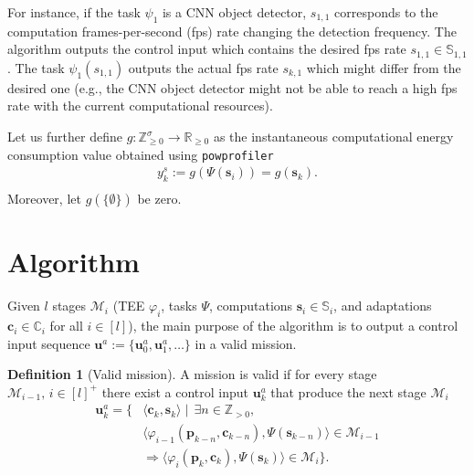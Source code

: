 \documentclass[letterpaper,10pt,conference]{ieeeconf}
\newcommand{\stt}[1]{{\small\tt #1}} %
\newcommand{\powprof}{\stt{powprofiler}}
\theoremstyle{definition}
\newtheorem{defn}{Definition}[section]
\begin{document}
For instance, if the task $\psi_1$ is a CNN object detector, $s_{1,1}$ corresponds to the computation frames-per-second (fps) rate changing the detection frequency. The algorithm outputs the control input which contains the desired fps rate $s_{1,1}\in\mathbb{S}_{1,1}$. The task $\psi_1(s_{1,1})$ outputs the actual fps rate $s_{k,1}$ which might differ from the desired one (e.g., the CNN object detector might not be able to reach a high fps rate with the current computational resources).

Let us further define $g:\mathbb{Z}_{\geq 0}^{\sigma}\rightarrow\mathbb{R}_{\geq 0}$ as the instantaneous computational energy consumption value obtained using \powprof{}
\begin{equation}\label{eq:energy-comp}\begin{split}
  y_k^s:=g\left(\Psi(\mathbf{s}_i)\right)=g\left(\mathbf{s}_{k}\right).\\
\end{split}\end{equation}
Moreover, let $g(\{\emptyset\})$ be zero.


\section{Algorithm}
\label{sec:algo}

Given $l$ stages $\mathcal{M}_i$ (TEE $\varphi_i$, tasks $\Psi$, computations $\mathbf{s}_i\in\mathbb{S}_i$, and adaptations $\mathbf{c}_i\in\mathbb{C}_i$ for all $i\in[l]$), the main purpose of the algorithm is to output a control input sequence $\mathbf{u}^a:=\{\mathbf{u}_0^a,\mathbf{u}_1^a,\dots\}$ in a valid mission.

\begin{defn}[Valid mission]\label{def:valid}
  A mission is valid if for every stage $\mathcal{M}_{i-1},\,i\in[l]^+$ there exist a control input $\mathbf{u}_k^{a}$ that produce the next stage $\mathcal{M}_i$
  \begin{equation}\begin{split}\label{eq:mission-valid}
    \mathbf{u}^a_{k}=\{&\langle\mathbf{c}_{k},\mathbf{s}_{k}\rangle\mid\,\exists n\in\mathbb{Z}_{>0},\\&\langle\varphi_{i-1}(\mathbf{p}_{k-n},\mathbf{c}_{k-n}),\Psi(\mathbf{s}_{k-n})\rangle\in\mathcal{M}_{i-1}\\
    &\Longrightarrow\langle\varphi_i(\mathbf{p}_{k},\mathbf{c}_{k}),\Psi(\mathbf{s}_{k})\rangle\in\mathcal{M}_{i}\}.
  \end{split}\end{equation}
\end{defn}
\end{document}
